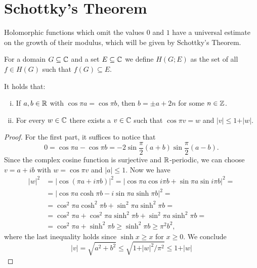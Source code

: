 \section{Schottky's Theorem}
\label{sec:schottkys-theorem}

Holomorphic functions which omit the values $0$ and $1$ have a universal estimate on the growth of their modulus, which will be given by Schottky's Theorem.

For a domain $G \subseteq \mathbb{C}$ and a set $E \subseteq \mathbb{C}$ we define $H(G; E)$ as the set of all $f \in H(G)$ such that $f(G) \subseteq E$.

\begin{lemma} \label{lem:schottky-1}
    It holds that:
    \begin{enumerate}[i.]
        \item If $a, b \in \mathbb{R}$ with $\cos \pi a = \cos \pi b$, then $b = \pm a + 2n$ for some $n \in \mathbb{Z}$.
        \item For every $w \in \mathbb{C}$ there exists a $v \in \mathbb{C}$ such that $\cos \pi v = w$ and $\vert v \vert \leq 1 + \vert w \vert$.
    \end{enumerate}
\end{lemma}

\begin{proof}
    For the first part, it suffices to notice that
    $$ 0 = \cos \pi a - \cos \pi b = \textstyle -2 \sin \frac{\pi}{2} ( a + b ) \sin \frac{\pi}{2} ( a - b ). $$
    Since the complex cosine function is surjective and $\mathbb{R}$-periodic, we can choose $v = a + i b$ with $w = \cos \pi v$ and $\vert a \vert \leq 1$. Now we have
    \begin{align*}
        \vert w \vert^2 &= \vert \cos (\pi a + i \pi b) \vert^2 = \vert \cos \pi a \cos i \pi b + \sin \pi a \sin i \pi b \vert^2 = \\
        &= \vert \cos \pi a \cosh \pi b - i \sin \pi a \sinh \pi b \vert^2 = \\
        &= \cos^2 \pi a \cosh^2 \pi b + \sin^2 \pi a \sinh^2 \pi b = \\
        &= \cos^2 \pi a + \cos^2 \pi a \sinh^2 \pi b + \sin^2 \pi a \sinh^2 \pi b = \\
        &= \cos^2 \pi a + \sinh^2 \pi b \geq \sinh^2 \pi b \geq \pi^2 b^2,
    \end{align*}
    where the last inequality holds since $\sinh x \geq x$ for $x \geq 0$. We conclude
    \begin{equation*}
        \vert v \vert = \sqrt{a^2 + b^2} \leq \sqrt{1 + \vert w \vert^2 / \pi^2} \leq 1 + \vert w \vert
    \end{equation*}
\end{proof}

